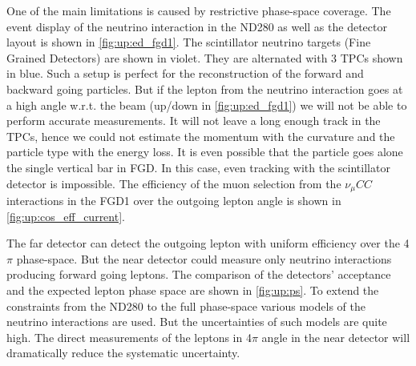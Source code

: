 \documentclass[../main.tex]{subfiles}
\begin{document}
One of the main limitations is caused by restrictive phase-space coverage. The event display of the neutrino interaction in the ND280 as well as the detector layout is shown in \autoref{fig:up:ed_fgd1}. The scintillator neutrino targets (Fine Grained Detectors) are shown in violet. They are alternated with 3 TPCs shown in blue. Such a setup is perfect for the reconstruction of the forward and backward going particles. But if the lepton from the neutrino interaction goes at a high angle w.r.t. the beam (up/down in \autoref{fig:up:ed_fgd1}) we will not be able to perform accurate measurements. It will not leave a long enough track in the TPCs, hence we could not estimate the momentum with the curvature and the particle type with the energy loss. It is even possible that the particle goes alone the single vertical bar in FGD. In this case, even tracking with the scintillator detector is impossible. The efficiency of the muon selection from the $\nu_\mu CC$ interactions in the FGD1 over the outgoing lepton angle is shown in \autoref{fig:up:cos_eff_current}.

The far detector can detect the outgoing lepton with uniform efficiency over the 4$\pi$ phase-space. But the near detector could measure only neutrino interactions producing forward going leptons. The comparison of the detectors' acceptance and the expected lepton phase space are shown in \autoref{fig:up:ps}. To extend the constraints from the ND280 to the full phase-space various models of the neutrino interactions are used. But the uncertainties of such models are quite high. The direct measurements of the leptons in 4$\pi$ angle in the near detector will dramatically reduce the systematic uncertainty.
\end{document}
